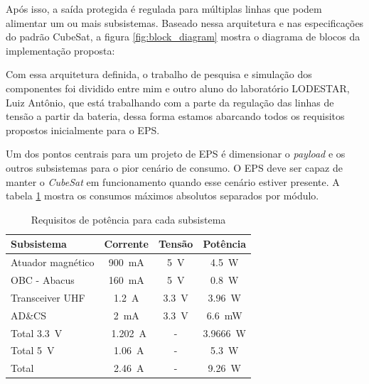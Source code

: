 Após isso, a saída protegida é regulada para múltiplas linhas que podem alimentar um ou mais subsistemas. Baseado nessa arquitetura e nas especificações do padrão CubeSat, a figura \ref{fig:block_diagram} mostra o diagrama de blocos da implementação proposta:

\noindent
\begin{minipage}{\linewidth}
\label{fig:block_diagram}
\end{minipage}

Com essa arquitetura definida, o trabalho de pesquisa e simulação dos componentes foi dividido entre mim e outro aluno do laboratório LODESTAR, Luiz Antônio, que está trabalhando com a parte da regulação das linhas de tensão a partir da bateria, dessa forma estamos abarcando todos os requisitos propostos inicialmente para o EPS.

Um dos pontos centrais para um projeto de EPS é dimensionar o \textit{payload} e os outros subsistemas para o pior cenário de consumo. O EPS deve ser capaz de manter o \textit{CubeSat} em funcionamento quando esse cenário estiver presente. A tabela \ref{tab:requisites_modules} mostra os consumos máximos absolutos separados por módulo.

\begin{table}[!ht]
    \centering
    \begin{tabular}{l|ccc}
        Subsistema & Corrente & Tensão & Potência \\
        \hline
        Atuador magnético & \SI{900}{\milli\ampere} & \SI{5}{\volt} & \SI{4,5}{\watt}\\
        OBC - Abacus & \SI{160}{\milli\ampere} & \SI{5}{\volt} & \SI{0.8}{\watt}\\
        Transceiver UHF & \SI{1.2}{\ampere} & \SI{3.3}{\volt} & \SI{3.96}{\watt}\\
        AD\&CS & \SI{2}{\milli\ampere} & \SI{3.3}{\volt} & \SI{6.6}{\milli\watt}\\
        \hline
        Total \SI{3.3}{\volt} & ~\SI{1.202}{\ampere} & - & \SI{3.9666}{\watt}\\
        Total \SI{5}{\volt} & ~\SI{1.06}{\ampere} & - & \SI{5.3}{\watt}\\ \hline
        Total & ~\SI{2.46}{\ampere} & - & \SI{9.26}{\watt}\\
    \end{tabular}
    \caption{Requisitos de potência para cada subsistema}
    \label{tab:requisites_modules}
\end{table}

